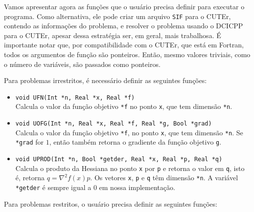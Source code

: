 Vamos apresentar agora as funções que o usuário precisa definir para executar o
programa. Como alternativa, ele pode criar um arquivo \verb+SIF+ para o CUTEr,
contendo as informações do problema, e resolver o problema usando o DCICPP para
o CUTEr, apesar dessa estratégia ser, em geral, mais trabalhosa.
É importante notar que, por compatibilidade com o CUTEr, que está em Fortran,
todos os argumentos de função são ponteiros. Então, mesmo valores triviais, como
o número de variáveis, são passados como ponteiros.

Para problemas irrestritos, é necessário definir as seguintes funções:
\begin{itemize}
  \item \verb+void UFN(Int *n, Real *x, Real *f)+ \\
    Calcula o valor da função objetivo \verb+*f+ no ponto \verb+x+, que tem
    dimensão \verb+*n+.
  \item \verb+void UOFG(Int *n, Real *x, Real *f, Real *g, Bool *grad)+ \\
    Calcula o valor da função objetivo \verb+*f+, no ponto \verb+x+, que tem
    dimensão \verb+*n+. Se \verb+*grad+ for $1$, então também retorna o
    gradiente da função objetivo \verb+g+.
  \item \verb+void UPROD(Int *n, Bool *getder, Real *x, Real *p, Real *q)+ \\
    Calcula o produto da Hessiana no ponto \verb+x+ por \verb+p+ e retorna o
    valor em \verb+q+, isto é, retorna $q = \nabla^2 f(x)p$. Os vetores
    \verb+x+, \verb+p+ e \verb+q+ têm dimensão \verb+*n+. A variável
    \verb+*getder+ é sempre igual a $0$ em nossa implementação.
\end{itemize}
Para problemas restritos, o usuário precisa definir as seguintes funções:
